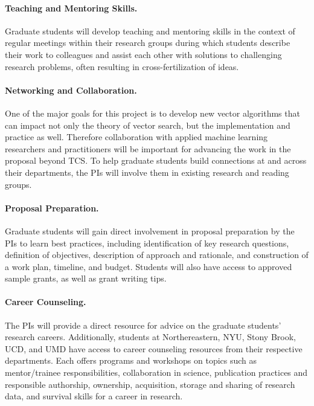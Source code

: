 \paragraph{Teaching and Mentoring Skills.} Graduate students will develop teaching and mentoring skills in the context of regular meetings within their research groups during which students describe their work to colleagues and assist each other with solutions to challenging research problems, often resulting in cross-fertilization of ideas.

\paragraph{Networking and Collaboration.} One of the major goals for this project is to develop new vector algorithms that can impact not only the theory of vector search, but the implementation and practice as well. Therefore collaboration with applied machine learning researchers and practitioners will be important for advancing the work in the proposal beyond TCS. To help graduate students build connections at and across their departments, the PIs will involve them in existing research and reading groups. 

\paragraph{Proposal Preparation.} Graduate students will gain direct involvement in proposal preparation by the PIs to learn best practices, including identification of key research questions, definition of objectives, description of approach and rationale, and construction of a work plan, timeline, and budget. Students will also have access to approved sample grants, as well as grant writing tips.

\paragraph{Career Counseling.} The PIs will provide a direct resource for advice on the graduate students’ research careers. Additionally, students at Northereastern, NYU, Stony Brook, UCD, and UMD have access to career counseling resources from their respective departments. Each offers programs and workshops on topics such as mentor/trainee responsibilities, collaboration in science, publication practices and responsible authorship, ownership, acquisition, storage and sharing of research data, and survival skills for a career in research.
